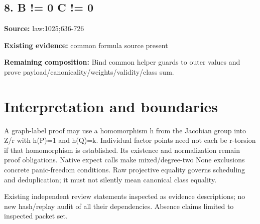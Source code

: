 \documentclass[10pt]{article}
\begin{document}
\subsection*{8. B != 0 C != 0}
\textbf{Source:} law:1025;636-726\par
\textbf{Existing evidence:} common formula source present\par
\textbf{Remaining composition:} Bind common helper guards to outer values and prove payload/canonicality/weights/validity/class sum.\par
\section*{Interpretation and boundaries}
A graph-label proof may use a homomorphism h from the Jacobian group into Z/r with h(P)=1 and h(Q)=k. Individual factor points need not each be r-torsion if that homomorphism is established. Its existence and normalization remain proof obligations. Native expect calls make mixed/degree-two None exclusions concrete panic-freedom conditions. Raw projective equality governs scheduling and deduplication; it must not silently mean canonical class equality.
\par
Existing independent review statements inspected as evidence descriptions; no new hash/replay audit of all their dependencies. Absence claims limited to inspected packet set.
\end{document}
